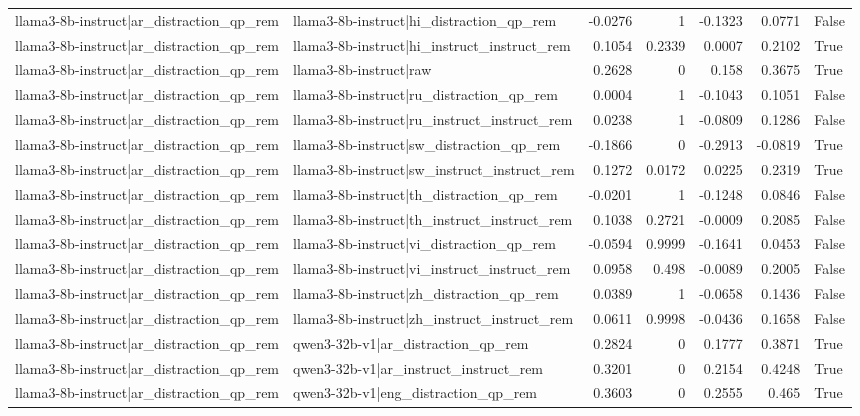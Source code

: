 \begin{table}
\begin{tabular}{l l r r r r l}
llama3-8b-instruct|ar_distraction_qp_rem & llama3-8b-instruct|hi_distraction_qp_rem & -0.0276 & 1 & -0.1323 & 0.0771 & False \\
llama3-8b-instruct|ar_distraction_qp_rem & llama3-8b-instruct|hi_instruct_instruct_rem & 0.1054 & 0.2339 & 0.0007 & 0.2102 & True \\
llama3-8b-instruct|ar_distraction_qp_rem & llama3-8b-instruct|raw & 0.2628 & 0 & 0.158 & 0.3675 & True \\
llama3-8b-instruct|ar_distraction_qp_rem & llama3-8b-instruct|ru_distraction_qp_rem & 0.0004 & 1 & -0.1043 & 0.1051 & False \\
llama3-8b-instruct|ar_distraction_qp_rem & llama3-8b-instruct|ru_instruct_instruct_rem & 0.0238 & 1 & -0.0809 & 0.1286 & False \\
llama3-8b-instruct|ar_distraction_qp_rem & llama3-8b-instruct|sw_distraction_qp_rem & -0.1866 & 0 & -0.2913 & -0.0819 & True \\
llama3-8b-instruct|ar_distraction_qp_rem & llama3-8b-instruct|sw_instruct_instruct_rem & 0.1272 & 0.0172 & 0.0225 & 0.2319 & True \\
llama3-8b-instruct|ar_distraction_qp_rem & llama3-8b-instruct|th_distraction_qp_rem & -0.0201 & 1 & -0.1248 & 0.0846 & False \\
llama3-8b-instruct|ar_distraction_qp_rem & llama3-8b-instruct|th_instruct_instruct_rem & 0.1038 & 0.2721 & -0.0009 & 0.2085 & False \\
llama3-8b-instruct|ar_distraction_qp_rem & llama3-8b-instruct|vi_distraction_qp_rem & -0.0594 & 0.9999 & -0.1641 & 0.0453 & False \\
llama3-8b-instruct|ar_distraction_qp_rem & llama3-8b-instruct|vi_instruct_instruct_rem & 0.0958 & 0.498 & -0.0089 & 0.2005 & False \\
llama3-8b-instruct|ar_distraction_qp_rem & llama3-8b-instruct|zh_distraction_qp_rem & 0.0389 & 1 & -0.0658 & 0.1436 & False \\
llama3-8b-instruct|ar_distraction_qp_rem & llama3-8b-instruct|zh_instruct_instruct_rem & 0.0611 & 0.9998 & -0.0436 & 0.1658 & False \\
llama3-8b-instruct|ar_distraction_qp_rem & qwen3-32b-v1|ar_distraction_qp_rem & 0.2824 & 0 & 0.1777 & 0.3871 & True \\
llama3-8b-instruct|ar_distraction_qp_rem & qwen3-32b-v1|ar_instruct_instruct_rem & 0.3201 & 0 & 0.2154 & 0.4248 & True \\
llama3-8b-instruct|ar_distraction_qp_rem & qwen3-32b-v1|eng_distraction_qp_rem & 0.3603 & 0 & 0.2555 & 0.465 & True \\

\end{tabular}
\end{table}
